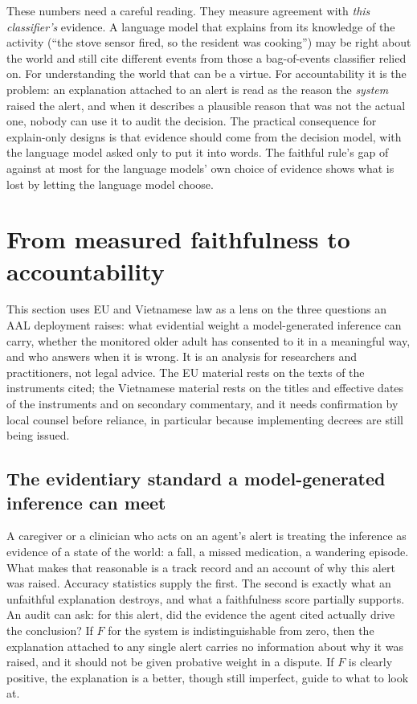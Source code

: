 \documentclass[11pt,a4paper]{article}
\begin{document}
These numbers need a careful reading. They measure agreement with \emph{this classifier's} evidence. A language model that explains from its knowledge of the activity (``the stove sensor fired, so the resident was cooking'') may be right about the world and still cite different events from those a bag-of-events classifier relied on. For understanding the world that can be a virtue. For accountability it is the problem: an explanation attached to an alert is read as the reason the \emph{system} raised the alert, and when it describes a plausible reason that was not the actual one, nobody can use it to audit the decision. The practical consequence for explain-only designs is that evidence should come from the decision model, with the language model asked only to put it into words. The faithful rule's gap of \XAFaithfulGap{} against at most \XADeepEnrGap{} for the language models' own choice of evidence shows what is lost by letting the language model choose.

\section{From measured faithfulness to accountability}
\label{sec:accountability}

This section uses EU and Vietnamese law as a lens on the three questions an AAL deployment raises: what evidential weight a model-generated inference can carry, whether the monitored older adult has consented to it in a meaningful way, and who answers when it is wrong. It is an analysis for researchers and practitioners, not legal advice. The EU material rests on the texts of the instruments cited; the Vietnamese material rests on the titles and effective dates of the instruments and on secondary commentary, and it needs confirmation by local counsel before reliance, in particular because implementing decrees are still being issued.

\subsection{The evidentiary standard a model-generated inference can meet}
A caregiver or a clinician who acts on an agent's alert is treating the inference as evidence of a state of the world: a fall, a missed medication, a wandering episode. What makes that reasonable is a track record and an account of why this alert was raised. Accuracy statistics supply the first. The second is exactly what an unfaithful explanation destroys, and what a faithfulness score partially supports. An audit can ask: for this alert, did the evidence the agent cited actually drive the conclusion? If $F$ for the system is indistinguishable from zero, then the explanation attached to any single alert carries no information about why it was raised, and it should not be given probative weight in a dispute. If $F$ is clearly positive, the explanation is a better, though still imperfect, guide to what to look at.
\end{document}
